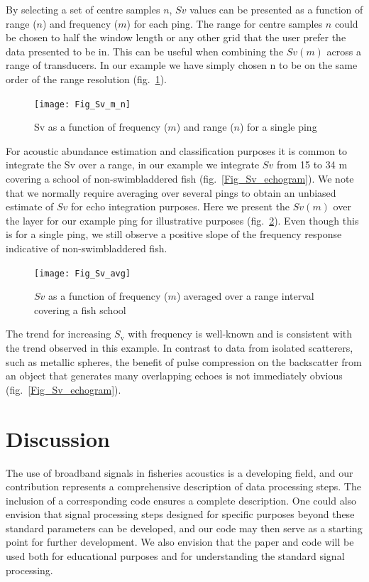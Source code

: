 \documentclass[preprint,12pt,TurnOnLineNumbers]{JASAnew}
\newcommand{\sv}{S_{\textrm{v}}}
\begin{document}
By selecting a set of centre samples $n$, $Sv$ values can be presented as a function of range ($n$) and frequency ($m$) for each ping. The range for centre samples $n$ could be chosen to half the window length or any other grid that the user prefer the data presented to be in. This can be useful when combining the $Sv(m)$ across a range of transducers. In our example we have simply chosen n to be on the same order of the range resolution (fig.~\ref{Fig_Sv_m_n}).

\begin{figure}
\texttt{[image: Fig\_Sv\_m\_n]}
\caption{\label{Fig_Sv_m_n} Sv as a function of frequency ($m$) and range ($n$) for a single ping}
\end{figure}

For acoustic abundance estimation and classification purposes it is common to integrate the Sv over a range, in our example we integrate $Sv$ from 15 to 34 m covering a school of non-swimbladdered fish (fig.~\ref{Fig_Sv_echogram}). We note that we normally require averaging over several pings to obtain an unbiased estimate of $Sv$ for echo integration purposes. Here we present the $Sv(m)$ over the layer for our example ping for illustrative purposes (fig.~\ref{Fig_Sv_avg}). Even though this is for a single ping, we still observe a positive slope of the frequency response indicative of non-swimbladdered fish. 

\begin{figure}
\texttt{[image: Fig\_Sv\_avg]}
\caption{\label{Fig_Sv_avg} $Sv$ as a function of frequency ($m$) averaged over a range interval covering a fish school }
\end{figure}

The trend for increasing $\sv$ with frequency is well-known \citep{korneliussen2010} and is consistent with the trend observed in this example. In contrast to data from isolated scatterers, such as metallic spheres, the benefit of pulse compression on the backscatter from an object that generates many overlapping echoes is not immediately obvious (fig.~\ref{Fig_Sv_echogram}).

\section{Discussion}

The use of broadband signals in fisheries acoustics is a developing field, and our contribution represents a comprehensive description of data processing steps. The inclusion of a corresponding code ensures a complete description. One could also envision that signal processing steps designed for specific purposes beyond these standard parameters can be developed, and our code may then serve as a starting point for further development. We also envision that the paper and code will be used both for educational purposes and for understanding the standard signal processing.
\end{document}
